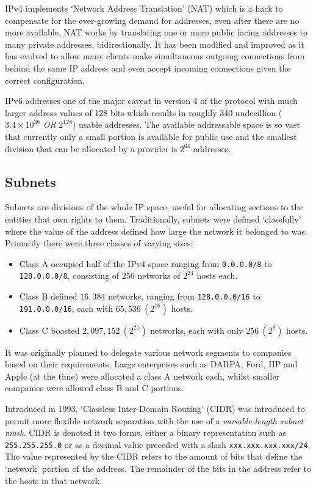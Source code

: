     IPv4 implements `Network Address Translation' (NAT) which is a hack to compensate for the ever-growing demand for addresses, even after there are no more available. NAT works by translating one or more public facing addresses to many private addresses, bidirectionally. It has been modified and improved as it has evolved to allow many clients make simultaneous outgoing connections from behind the same IP address and even accept incoming connections given the correct configuration.

    IPv6 addresses one of the major caveat in version 4 of the protocol with much larger address values of 128 bits which results in roughly 340 undecillion ($3.4 \times 10^{38}$ \textit{OR} $2^{128}$) usable addresses. The available addressable space is so vast that currently only a small portion is available for public use and the smallest division that can be allocated by a provider is $2^{64}$ addresses.

    \subsection{Subnets}
    Subnets are divisions of the whole IP space, useful for allocating sections to the entities that own rights to them. Traditionally, subnets were defined `classfully' where the value of the address defined how large the network it belonged to was. Primarily there were three classes of varying sizes:
    \begin{itemize}
        \item{Class A occupied half of the IPv4 space ranging from \texttt{0.0.0.0/8} to \texttt{128.0.0.0/8}, consisting of 256 networks of $2^{24}$ hosts each.}
        \item{Class B defined $16,384$ networks, ranging from \texttt{128.0.0.0/16} to \texttt{191.0.0.0/16}, each with $65,536\ (2^{16})$ hosts.}
        \item{Class C boasted $2,097,152\ (2^{21})$ networks, each with only $256\ (2^{8})$ hosts.}
    \end{itemize}

    It was originally planned to delegate various network segments to companies based on their requirements. Large enterprises such as DARPA, Ford, HP and Apple (at the time) were allocated a class A network each, whilst smaller companies were allowed class B and C portions.

    Introduced in 1993, `Classless Inter-Domain Routing' (CIDR) was introduced to permit more flexible network separation with the use of a \textit{variable-length subnet mask}. CIDR is denoted it two forms, either a binary representation such as \texttt{255.255.255.0} or as a decimal value preceded with a slash \texttt{xxx.xxx.xxx.xxx/24}. The value represented by the CIDR refers to the amount of bits that define the `network' portion of the address. The remainder of the bits in the address refer to the hosts in that network.

